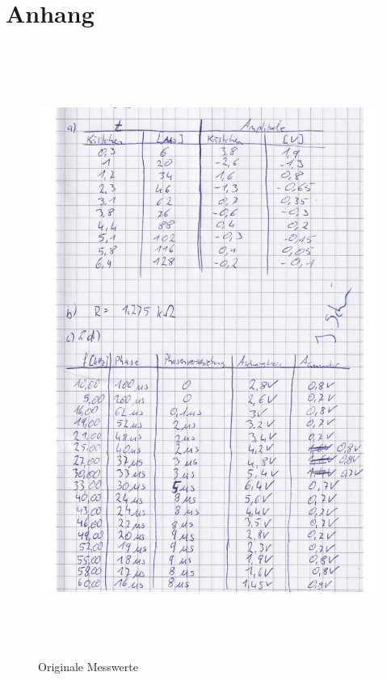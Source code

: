 \section{Anhang}
\label{sec:Anhang}
\begin{figure}[H]
    \centering
    \caption{Originale Messwerte}
    \includegraphics[width=15cm,height=20cm,keepaspectratio]{Messwerte.pdf}
\end{figure}